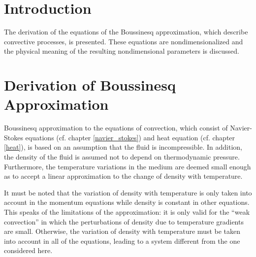 \providecommand{\partialTimeTemp}{\partial_t\theta}
\providecommand{\inertTermTemp}{(\velocity\nabla)\theta}
\providecommand{\tempGrad}{\nabla \theta}
\providecommand{\laplacianTemp}{\Delta\theta}


\providecommand{\divergenceNondim}{\nabla^{\prime}\cdot}

\providecommand{\velocityNondim}{\mathbf{v^{\prime}}}

\providecommand{\substDerivVelNondim}{\frac{D\velocity^{\prime}}{dt^{\prime}}}
\providecommand{\partialTimeVelNondim}{\partial_{t^{\prime}}\velocity^{\prime}}
\providecommand{\inertTermVelNondim}{(\velocity^{\prime}\nabla^{\prime})\velocity^{\prime}}

\providecommand{\velocityPressureTensorNondim}{\partial_k^{\prime}v^{l \prime}\partial_k^{\prime}v^{l \prime}}

\providecommand{\pressGradNondim}{\nabla^{\prime} p^{\prime}}
\providecommand{\pressLaplacianNondim}{\Delta^{\prime} p^{\prime}}
\providecommand{\laplacianVelNondim}{\Delta^{\prime}\velocity^{\prime}}

\section{Introduction}

The derivation of the equations of the Boussinesq approximation, which describe convective processes, is presented. These equations are nondimensionalized and the physical meaning of the resulting nondimensional parameters is discussed.
 
\section{Derivation of Boussinesq Approximation}

Boussinesq approximation to the equations of convection, which consist of Navier-Stokes equations (cf. chapter \ref{navier_stokes}) and heat equation (cf. chapter \ref{heat}), is based on an assumption that the fluid is incompressible. In addition, the density of the fluid is assumed not to depend on thermodynamic pressure. Furthermore, the temperature variations in the medium are deemed small enough as to accept a linear approximation to the change of density with temperature. 

It must be noted that the variation of density with temperature is only taken into account in the momentum equations while density is constant in other equations. This speaks of the limitations of the approximation: it is only valid for the ``weak convection'' in which the perturbations of density due to temperature gradients are small. Otherwise, the variation of density with temperature must be taken into account in all of the equations, leading to a system different from the one considered here.

